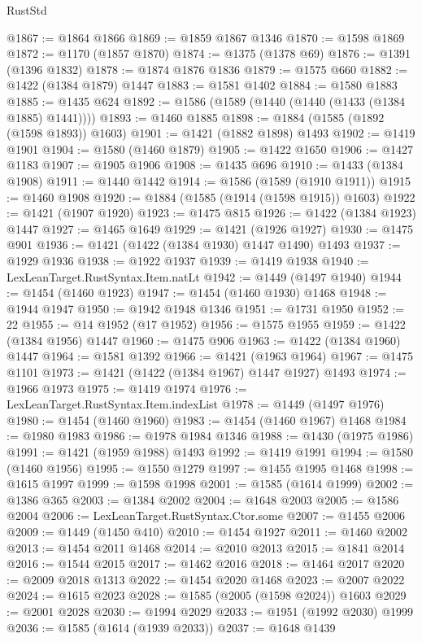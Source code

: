 \begin{lexlean}{RustStd}
\begin{coremodule}
@1867 := @1864 @1866
@1869 := @1859 @1867 @1346
@1870 := @1598 @1869
@1872 := @1170 (@1857 @1870)
@1874 := @1375 (@1378 @69)
@1876 := @1391 (@1396 @1832)
@1878 := @1874 @1876 @1836
@1879 := @1575 @660
@1882 := @1422 (@1384 @1879) @1447
@1883 := @1581 @1402
@1884 := @1580 @1883
@1885 := @1435 @624
@1892 := @1586 (@1589 (@1440 (@1440 (@1433 (@1384 @1885) @1441))))
@1893 := @1460 @1885
@1898 := @1884 (@1585 (@1892 (@1598 @1893)) @1603)
@1901 := @1421 (@1882 @1898) @1493
@1902 := @1419 @1901
@1904 := @1580 (@1460 @1879)
@1905 := @1422 @1650
@1906 := @1427 @1183
@1907 := @1905 @1906
@1908 := @1435 @696
@1910 := @1433 (@1384 @1908)
@1911 := @1440 @1442
@1914 := @1586 (@1589 (@1910 @1911))
@1915 := @1460 @1908
@1920 := @1884 (@1585 (@1914 (@1598 @1915)) @1603)
@1922 := @1421 (@1907 @1920)
@1923 := @1475 @815
@1926 := @1422 (@1384 @1923) @1447
@1927 := @1465 @1649
@1929 := @1421 (@1926 @1927)
@1930 := @1475 @901
@1936 := @1421 (@1422 (@1384 @1930) @1447 @1490) @1493
@1937 := @1929 @1936
@1938 := @1922 @1937
@1939 := @1419 @1938
@1940 := LexLeanTarget.RustSyntax.Item.natLt
@1942 := @1449 (@1497 @1940)
@1944 := @1454 (@1460 @1923)
@1947 := @1454 (@1460 @1930) @1468
@1948 := @1944 @1947
@1950 := @1942 @1948 @1346
@1951 := @1731 @1950
@1952 := 22
@1955 := @14 @1952 (@17 @1952)
@1956 := @1575 @1955
@1959 := @1422 (@1384 @1956) @1447
@1960 := @1475 @906
@1963 := @1422 (@1384 @1960) @1447
@1964 := @1581 @1392
@1966 := @1421 (@1963 @1964)
@1967 := @1475 @1101
@1973 := @1421 (@1422 (@1384 @1967) @1447 @1927) @1493
@1974 := @1966 @1973
@1975 := @1419 @1974
@1976 := LexLeanTarget.RustSyntax.Item.indexList
@1978 := @1449 (@1497 @1976)
@1980 := @1454 (@1460 @1960)
@1983 := @1454 (@1460 @1967) @1468
@1984 := @1980 @1983
@1986 := @1978 @1984 @1346
@1988 := @1430 (@1975 @1986)
@1991 := @1421 (@1959 @1988) @1493
@1992 := @1419 @1991
@1994 := @1580 (@1460 @1956)
@1995 := @1550 @1279
@1997 := @1455 @1995 @1468
@1998 := @1615 @1997
@1999 := @1598 @1998
@2001 := @1585 (@1614 @1999)
@2002 := @1386 @365
@2003 := @1384 @2002
@2004 := @1648 @2003
@2005 := @1586 @2004
@2006 := LexLeanTarget.RustSyntax.Ctor.some
@2007 := @1455 @2006
@2009 := @1449 (@1450 @410)
@2010 := @1454 @1927
@2011 := @1460 @2002
@2013 := @1454 @2011 @1468
@2014 := @2010 @2013
@2015 := @1841 @2014
@2016 := @1544 @2015
@2017 := @1462 @2016
@2018 := @1464 @2017
@2020 := @2009 @2018 @1313
@2022 := @1454 @2020 @1468
@2023 := @2007 @2022
@2024 := @1615 @2023
@2028 := @1585 (@2005 (@1598 @2024)) @1603
@2029 := @2001 @2028
@2030 := @1994 @2029
@2033 := @1951 (@1992 @2030) @1999
@2036 := @1585 (@1614 (@1939 @2033))
@2037 := @1648 @1439

\end{coremodule}
\end{lexlean}
